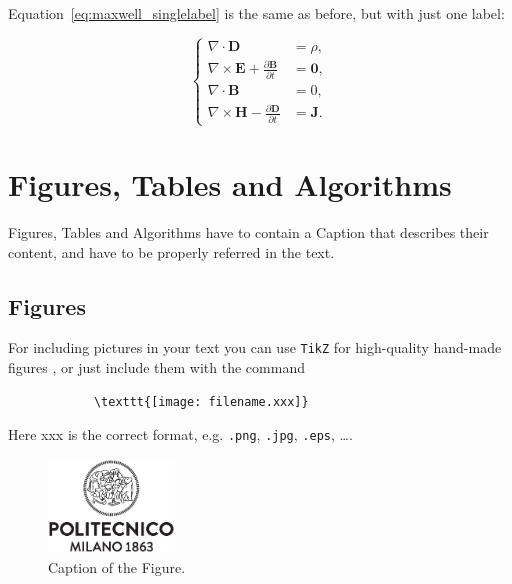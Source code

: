 \documentclass[11pt,a4paper]{article}
\begin{document}
    Equation~\eqref{eq:maxwell_singlelabel} is the same as before,
    but with just one label:

    \begin{equation}
        \label{eq:maxwell_singlelabel}
        \left\{
        \begin{aligned}
            \nabla\cdot \bm{D} & = \rho, \\
            \nabla \times \bm{E} +  \frac{\partial \bm{B}}{\partial t} &= \bm{0},\\
            \nabla\cdot \bm{B} & = 0, \\
            \nabla \times \bm{H} - \frac{\partial \bm{D}}{\partial t} &= \bm{J}.
        \end{aligned}
        \right.
    \end{equation}

\section{Figures, Tables and Algorithms}

    Figures, Tables and Algorithms have to contain a Caption that describes their content, and have to be properly referred in the text.

    \subsection{Figures} \label{subsec:figures}

        For including pictures in your text you can use \texttt{TikZ} for high-quality hand-made figures \cite{tikz}, or just include them with the command

        \begin{verbatim}
            \texttt{[image: filename.xxx]}
        \end{verbatim}

        Here xxx is the correct format, e.g.  \verb|.png|, \verb|.jpg|, \verb|.eps|, \dots.

        \begin{figure}[H]
            \centering
            \includegraphics[width=0.3\textwidth]{logo_polimi_scritta.eps}
            \caption{Caption of the Figure.}
            \label{fig:quadtree}
        \end{figure}
\end{document}
